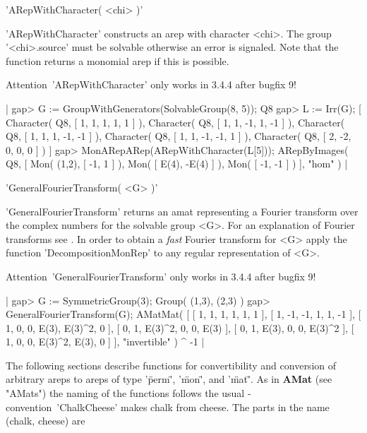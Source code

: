 
'ARepWithCharacter( <chi> )'

'ARepWithCharacter' constructs an arep with character <chi>. 
The group '<chi>.source' must be solvable otherwise an error is
signaled. Note that the function returns a monomial arep 
if this is possible.

Attention\:\ 'ARepWithCharacter' only works in {\GAP} 3.4.4 after
bugfix 9!

|    gap> G := GroupWithGenerators(SolvableGroup(8, 5));
    Q8
    gap> L := Irr(G);
    [ Character( Q8, [ 1, 1, 1, 1, 1 ] ), 
      Character( Q8, [ 1, 1, -1, 1, -1 ] ), 
      Character( Q8, [ 1, 1, 1, -1, -1 ] ), 
      Character( Q8, [ 1, 1, -1, -1, 1 ] ), 
      Character( Q8, [ 2, -2, 0, 0, 0 ] ) ]
    gap> MonARepARep(ARepWithCharacter(L[5]));
    ARepByImages(
      Q8,
      [ Mon(
          (1,2),
          [ -1, 1 ]
        ),
        Mon( [ E(4), -E(4) ] ),
        Mon( [ -1, -1 ] )
      ],
      "hom"
    ) |


'GeneralFourierTransform( <G> )'

'GeneralFourierTransform' returns an amat representing 
a Fourier transform over the complex numbers for the 
solvable group <G>. For an explanation of Fourier transforms
see \cite{CB93}. In order to obtain a {\em fast} Fourier transform
for <G> apply the function 'DecompositionMonRep' to any 
regular representation of <G>.

Attention\:\ 'GeneralFourierTransform' only works in {\GAP} 3.4.4 after
bugfix 9!

|    gap> G := SymmetricGroup(3);
    Group( (1,3), (2,3) )
    gap> GeneralFourierTransform(G);
    AMatMat(
      [ [ 1, 1, 1, 1, 1, 1 ], [ 1, -1, -1, 1, 1, -1 ], 
      [ 1, 0, 0, E(3), E(3)^2, 0 ], [ 0, 1, E(3)^2, 0, 0, E(3) ], 
      [ 0, 1, E(3), 0, 0, E(3)^2 ], [ 1, 0, 0, E(3)^2, E(3), 0 ] ],
      "invertible"
    ) ^ -1 |


The following sections describe functions for convertibility and 
conversion of arbitrary areps to areps of type 
'\"perm\"', '\"mon\"', and '\"mat\"'. As in {\bf AMat} (see "AMats")
the naming of the functions follows the usual {\GAP}-convention\:\ 
'ChalkCheese' makes chalk from cheese. The parts in the name 
(chalk, cheese) are\:\ 

